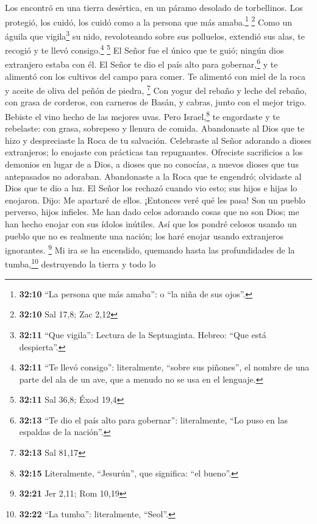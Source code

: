  Los encontró en una tierra desértica, en un páramo
desolado de torbellinos. Los protegió, los cuidó, los cuidó como a la
persona que más amaba.\footnote{\textbf{32:10} ``La persona que más
  amaba'': o ``la niña de sus ojos''.} \footnote{\textbf{32:10} Sal
  17,8; Zac 2,12}  Como un águila que vigila\footnote{\textbf{32:11}
  ``Que vigila'': Lectura de la Septuaginta. Hebreo: ``Que está
  despierta''.} su nido, revoloteando sobre sus polluelos, extendió sus
alas, te recogió y te llevó consigo.\footnote{\textbf{32:11} ``Te llevó
  consigo'': literalmente, ``sobre sus piñones'', el nombre de una parte
  del ala de un ave, que a menudo no se usa en el lenguaje.} \footnote{\textbf{32:11}
  Sal 36,8; Éxod 19,4}  El Señor fue el único que te
guió; ningún dios extranjero estaba con él.  El Señor te
dio el país alto para gobernar,\footnote{\textbf{32:13} ``Te dio el país
  alto para gobernar'': literalmente, ``Lo puso en las espaldas de la
  nación''.} y te alimentó con los cultivos del campo para comer. Te
alimentó con miel de la roca y aceite de oliva del peñón de piedra,
\footnote{\textbf{32:13} Sal 81,17}  Con yogur del rebaño
y leche del rebaño, con grasa de corderos, con carneros de Basán, y
cabras, junto con el mejor trigo. Bebiste el vino hecho de las mejores
uvas.  Pero Israel,\footnote{\textbf{32:15} Literalmente,
  ``Jesurún'', que significa: ``el bueno''.} te engordaste y te
rebelaste: con grasa, sobrepeso y llenura de comida. Abandonaste al Dios
que te hizo y despreciaste la Roca de tu salvación. 
Celebraste al Señor adorando a dioses extranjeros; lo enojaste con
prácticas tan repugnantes.  Ofreciste sacrificios a los
demonios en lugar de a Dios, a dioses que no conocías, a nuevos dioses
que tus antepasados no adoraban.  Abandonaste a la Roca
que te engendró; olvidaste al Dios que te dio a luz.  El
Señor los rechazó cuando vio esto; sus hijos e hijas lo enojaron.
 Dijo: Me apartaré de ellos. ¡Entonces veré qué les pasa!
Son un pueblo perverso, hijos infieles.  Me han dado
celos adorando cosas que no son Dios; me han hecho enojar con sus ídolos
inútiles. Así que los pondré celosos usando un pueblo que no es
realmente una nación; los haré enojar usando extranjeros ignorantes.
\footnote{\textbf{32:21} Jer 2,11; Rom 10,19}  Mi ira se
ha encendido, quemando hasta las profundidades de la tumba,\footnote{\textbf{32:22}
  ``La tumba'': literalmente, ``Seol''.} destruyendo la tierra y todo lo
